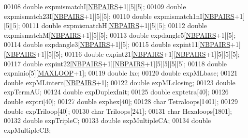 \begin{DoxyCode}
00108   \textcolor{keywordtype}{double}  expmismatchI[\hyperlink{energy__const_8h_a5e75221c779d618eab81e096f37e32ce}{NBPAIRS}+1][5][5];
00109   \textcolor{keywordtype}{double}  expmismatch23I[\hyperlink{energy__const_8h_a5e75221c779d618eab81e096f37e32ce}{NBPAIRS}+1][5][5];
00110   \textcolor{keywordtype}{double}  expmismatch1nI[\hyperlink{energy__const_8h_a5e75221c779d618eab81e096f37e32ce}{NBPAIRS}+1][5][5];
00111   \textcolor{keywordtype}{double}  expmismatchH[\hyperlink{energy__const_8h_a5e75221c779d618eab81e096f37e32ce}{NBPAIRS}+1][5][5];
00112   \textcolor{keywordtype}{double}  expmismatchM[\hyperlink{energy__const_8h_a5e75221c779d618eab81e096f37e32ce}{NBPAIRS}+1][5][5];
00113   \textcolor{keywordtype}{double}  expdangle5[\hyperlink{energy__const_8h_a5e75221c779d618eab81e096f37e32ce}{NBPAIRS}+1][5];
00114   \textcolor{keywordtype}{double}  expdangle3[\hyperlink{energy__const_8h_a5e75221c779d618eab81e096f37e32ce}{NBPAIRS}+1][5];
00115   \textcolor{keywordtype}{double}  expint11[\hyperlink{energy__const_8h_a5e75221c779d618eab81e096f37e32ce}{NBPAIRS}+1][\hyperlink{energy__const_8h_a5e75221c779d618eab81e096f37e32ce}{NBPAIRS}+1][5][5];
00116   \textcolor{keywordtype}{double}  expint21[\hyperlink{energy__const_8h_a5e75221c779d618eab81e096f37e32ce}{NBPAIRS}+1][\hyperlink{energy__const_8h_a5e75221c779d618eab81e096f37e32ce}{NBPAIRS}+1][5][5][5];
00117   \textcolor{keywordtype}{double}  expint22[\hyperlink{energy__const_8h_a5e75221c779d618eab81e096f37e32ce}{NBPAIRS}+1][\hyperlink{energy__const_8h_a5e75221c779d618eab81e096f37e32ce}{NBPAIRS}+1][5][5][5][5];
00118   \textcolor{keywordtype}{double}  expninio[5][\hyperlink{energy__const_8h_ad1bd6eabac419670ddd3c9ed82145988}{MAXLOOP}+1];
00119   \textcolor{keywordtype}{double}  lxc;
00120   \textcolor{keywordtype}{double}  expMLbase;
00121   \textcolor{keywordtype}{double}  expMLintern[\hyperlink{energy__const_8h_a5e75221c779d618eab81e096f37e32ce}{NBPAIRS}+1];
00122   \textcolor{keywordtype}{double}  expMLclosing;
00123   \textcolor{keywordtype}{double}  expTermAU;
00124   \textcolor{keywordtype}{double}  expDuplexInit;
00125   \textcolor{keywordtype}{double}  exptetra[40];
00126   \textcolor{keywordtype}{double}  exptri[40];
00127   \textcolor{keywordtype}{double}  exphex[40];
00128   \textcolor{keywordtype}{char}    Tetraloops[1401];
00129   \textcolor{keywordtype}{double}  expTriloop[40];
00130   \textcolor{keywordtype}{char}    Triloops[241];
00131   \textcolor{keywordtype}{char}    Hexaloops[1801];
00132   \textcolor{keywordtype}{double}  expTripleC;
00133   \textcolor{keywordtype}{double}  expMultipleCA;
00134   \textcolor{keywordtype}{double}  expMultipleCB;

\end{DoxyCode}
